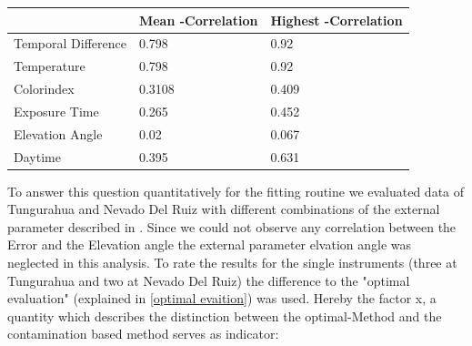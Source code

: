 \documentclass  [
  paper    = a4,
  BCOR     = 10mm,
  twoside,
  fontsize = 12pt,
  fleqn,
  toc      = bibnumbered,
  toc      = listofnumbered,
  numbers  = noendperiod,
  headings = normal,
  listof   = leveldown,
  version  = 3.03
]                                       {scrreprt}
\begin{document}
	\begin{table}[h]
		\begin{tabular}{|p{4cm}|p{3cm}|p{3cm}|}
			&  Mean -Correlation&  Highest   -Correlation\\
			\toprule
			Temporal Difference&0.798&	0.92\\
			\midrule
			Temperature &0.798&	0.92\\
			\midrule
			Colorindex &0.3108&	0.409\\
			\midrule
			Exposure Time &0.265&	0.452\\
			\midrule
			Elevation Angle &0.02&	0.067\\
			\midrule
			Daytime &0.395&	0.631\\
			\bottomrule
		\end{tabular}
	\end{table}
	\begin{figure}
		\caption{}
		\label{fig:WelcheEP}
	\end{figure}
	To answer this question quantitatively for the fitting routine we evaluated data of Tungurahua and Nevado Del Ruiz with different combinations of the external parameter described in . Since we could not observe any correlation between the   Error and the Elevation angle the external parameter elvation angle was neglected in this analysis. To rate the results for the single instruments (three at Tungurahua and two at Nevado Del Ruiz) the difference to the "optimal evaluation" (explained in \ref{optimal evaition}) was used. Hereby the factor x, a quantity which describes the distinction between the optimal-Method and the contamination based method serves as indicator:
\end{document}
